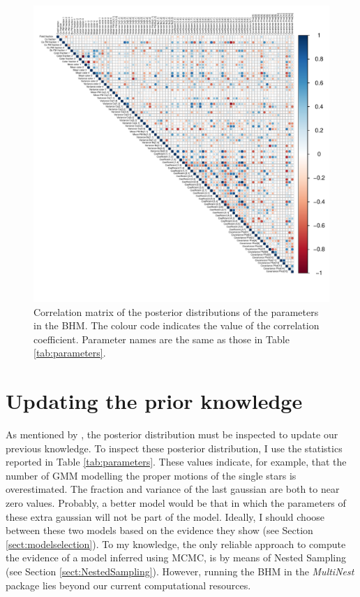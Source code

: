 \begin{figure}[ht!]
\begin{center}
\includegraphics[page=1,width=1.1\textwidth]{background/Figures/BHM/Correlations.pdf}
\caption{Correlation matrix of the posterior distributions of the parameters in the BHM. The colour code indicates the value of the correlation coefficient. Parameter names are the same as those in Table \ref{tab:parameters}.}
\label{fig:correlations}
\end{center}
\end{figure}

\section{Updating the prior knowledge}
\label{sect:updating_priors}
As mentioned by \citet{Gelman2006}, the posterior distribution must be inspected to update our previous knowledge. To inspect these posterior distribution, I use the statistics reported in Table \ref{tab:parameters}. These values indicate, for example, that the number of  GMM modelling the proper motions of the single stars is overestimated. The fraction and variance of the last gaussian are both to near zero values. Probably, a better model would be that in which the parameters of these extra gaussian will not be part of the model. Ideally, I should choose between these two models based on the evidence they show (see Section \ref{sect:modelselection}). To my knowledge, the only reliable approach to compute the evidence of a model inferred using MCMC, is by means of Nested Sampling (see Section \ref{sect:NestedSampling}). However, running the BHM in the \emph{MultiNest} package lies beyond our current computational resources.

